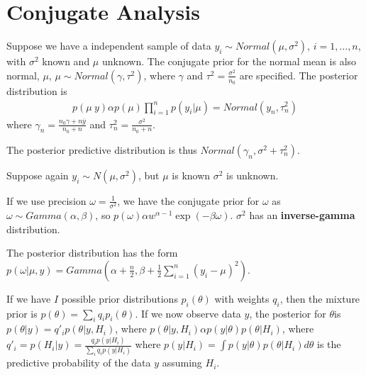 \section{Conjugate Analysis}
\label{sec:conjugate-analysis}

\begin{thm}
  \label{sec:conjugate-analysis-1}
  Suppose we have a independent sample of data $y_{i} \sim
  Normal(\mu, \sigma^{2})$, $i = 1, \dots, n$, with $\sigma^{2}$ known
  and $\mu$ unknown.  The conjugate prior for the normal mean is also
  normal, $\mu$, $\mu \sim Normal(\gamma, \tau^{2})$, where $\gamma$
  and $\tau^{2} = \frac{\sigma^{2}}{n_{0}} $ are specified.  The posterior distribution is
  \begin{align}
    \label{eq:11}
    p(\mu \ y) \alpha p(\mu) \prod_{i=1}^{n} p(y_{i} | \mu) =
    Normal(y_{n}, \tau^{2}_{n})
  \end{align} where $\gamma_{n} = \frac{n_{0} \gamma + n \overline
    y}{n_{0} + n}$ and $\tau^{2}_{n} = \frac{\sigma^{2}}{n_{0} + n}$.

  The posterior predictive distribution is thus $Normal(\gamma_{n},
  \sigma^{2} + \tau_{n}^{2})$.
\end{thm}

\begin{thm}
  \label{sec:conjugate-analysis-2}
  Suppose again $y_{i} \sim N(\mu, \sigma^{2})$, but $\mu$ is known
  $\sigma^{2}$ is unknown.

  If we use precision $\omega = \frac{1}{\sigma^{2}}$, we have the
  conjugate prior for $\omega$ as $\omega \sim Gamma(\alpha, \beta)$,
  so $p(\omega) \alpha w^{\alpha-1} \exp(-\beta \omega)$.
  $\sigma^{2}$ has an \textbf{inverse-gamma} distribution.

  The posterior distribution has the form $p(\omega | \mu, y) =
  Gamma(\alpha + \frac{n}{2}, \beta + \frac{1}{2} \sum_{i=1}^{n}
  (y_{i} - \mu)^{2})$.
\end{thm}

\begin{thm}
  \label{sec:conjugate-analysis-3}
  If we have $I$ possible prior distributions $p_{i}(\theta)$ with
  weights $q_{i}$, then the mixture prior is $p(\theta) = \sum_{i}^{}
  q_{i} p_{i}(\theta)$.  If we now observe data $y$, the posterior for
  $\theta$is $p(\theta | y) = q'_{i}p(\theta | y, H_{i})$, where
  $p(\theta | y, H_{i}) \alpha p(y | \theta) p(\theta | H_{i})$, where
  $q'_{i} = p(H_{i} | y) = \frac{q_{i} p(y | H_{i})}{\sum_{i} q_{i} p
    (y|H_{i})}$ where $p(y | H_{i}) = \int p(y | \theta) p(\theta |
  H_{i}) d\theta$ is the predictive probability of the data $y$
  assuming $H_{i}$.
\end{thm}

